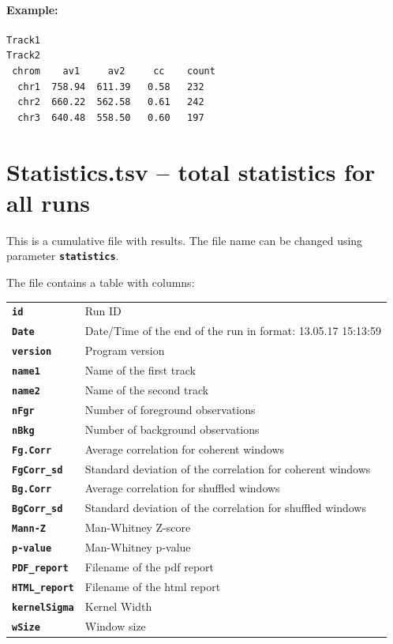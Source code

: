 \documentclass{article}
\newcommand{\tw}{\textwidth}
\newcommand{\prm}[1]{\texttt{\textbf{{#1}}}}
\begin{document}
\paragraph{Example:}\;\;
\begin{minipage}{0.35\tw}
\begin{shaded} 
\begin{verbatim}
Track1
Track2
 chrom	  av1 	  av2 	  cc 	count
  chr1  758.94  611.39   0.58   232
  chr2  660.22  562.58   0.61   242
  chr3  640.48  558.50   0.60   197
\end{verbatim}
\end{shaded}
\end{minipage}

\section{Statistics.tsv – total statistics for all runs}
This is a cumulative file with results. The file name can be changed using parameter \prm{statistics}.

The file contains a table with columns:

\begin{tabular}{ll}
\prm{id }         &  Run ID          \\
\prm{Date }       &  Date/Time of the end of the run in format:    13.05.17 15:13:59           \\
\prm{version}     &  Program version           \\
\prm{name1}       &  Name of the first track           \\
\prm{name2}       &  Name of the second track            \\
\prm{nFgr }       &  Number of foreground observations           \\
\prm{nBkg }       &  Number of background observations           \\
\prm{Fg.Corr}     &  Average correlation for coherent windows           \\
\prm{FgCorr\_sd}  &  Standard deviation of the correlation for coherent windows           \\
\prm{Bg.Corr}     &  Average correlation for shuffled windows           \\
\prm{BgCorr\_sd}  &  Standard deviation of the correlation for shuffled windows           \\
\prm{Mann-Z }     &  Man-Whitney Z-score            \\
\prm{p-value}     &  Man-Whitney p-value           \\
\prm{PDF\_report} &  Filename of the pdf report           \\
\prm{HTML\_report}&  Filename of the html report           \\
\prm{kernelSigma} &  Kernel Width           \\
\prm{wSize}       &  Window size           \\
\end{tabular}
\end{document}
